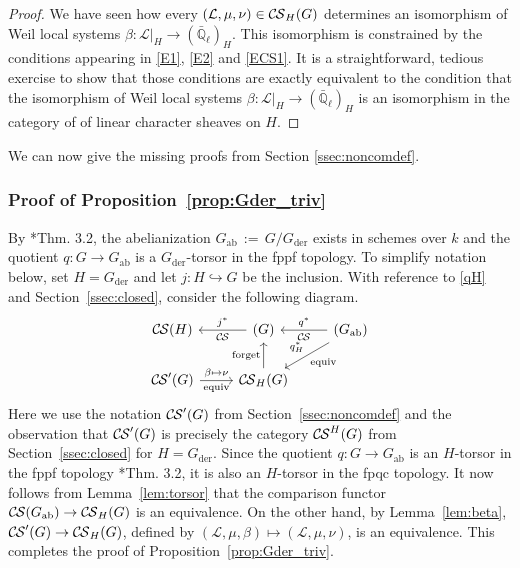 \documentclass[10pt]{amsart}
\theoremstyle{plain}
\theoremstyle{definition}
\newcommand{\EE}{\mathbb{\bar Q}_\ell}
\newcommand{\Fq}{k}
\newcommand{\der}{_{\operatorname{der}}}
\newcommand{\ab}{_{\operatorname{ab}}}
\newcommand{\ceq}{{\, :=\, }}
\newcommand{\cs}[1]{{\mathcal{#1}}}
\newcommand{\CS}{{\mathcal{C\hskip-0.8pt S}}}
\begin{document}
\begin{proof}
We have seen how every $(\cs{L},\mu,\nu)\in \CS_H(G)$ determines an isomorphism of Weil local systems $\beta : \cs{L}\vert_{H} \to (\EE)_{H}$.
This isomorphism is constrained by the conditions 
appearing in \eqref{E1}, \eqref{E2} and \eqref{ECS1}.
It is a straightforward, tedious exercise to show that those conditions are exactly equivalent to the condition
that the isomorphism of Weil local systems $\beta : \cs{L}\vert_{H} \to (\EE)_{H}$ is an isomorphism in the category of of linear character sheaves on $H$.
\end{proof}


We can now give the missing proofs from Section \ref{ssec:noncomdef}.

\subsubsection{Proof of Proposition~\ref{prop:Gder_triv}}\label{ssec:proof1}

By \cite{demazure:SGA3-VIA}*{Thm. 3.2}, the abelianization $G\ab\ceq G/G\der$ exists in schemes over $\Fq$ and the quotient $q: G \to G\ab$ is a $G\der$-torsor in the fppf topology.
%
To simplify notation below, set $H=G\der$
and let $j : H\hookrightarrow G$ be the inclusion. 
With reference to \eqref{qH} and Section~\ref{ssec:closed}, consider the following diagram.
\[
\begin{tikzcd}
\CS(H) & \arrow{l}[swap]{j^*} \CS(G) &\arrow{l}[swap]{q^*} 
\CS(G\ab) \arrow{dl}{\text{equiv}}[swap]{q_{H}^*} \\
 \CS'(G)  \arrow{r}{\beta \mapsto \nu}[swap]{\text{equiv}} &  \CS_{H}(G) \arrow{u}{\text{forget}}  & 
\end{tikzcd}
\]
%
Here we use the notation $\CS'(G)$ from Section~\ref{ssec:noncomdef} and the observation that $\CS'(G)$ is precisely the category $\CS^{H}(G)$ from Section~\ref{ssec:closed} for $H=G\der$.
%
Since the quotient $q : G \to G\ab$ is an $H$-torsor in the fppf topology \cite{demazure:SGA3-VIA}*{Thm. 3.2}, 
it is also an $H$-torsor in the fpqc topology.
It now follows from Lemma~\ref{lem:torsor} that the comparison functor $\CS(G\ab)\to \CS_{H}(G)$ is an equivalence.
%
On the other hand, by Lemma~\ref{lem:beta}, $\CS'(G) \to \CS_{H}(G)$, defined by $(\cs{L},\mu,\beta)\mapsto (\cs{L},\mu, \nu)$, is an equivalence.
This completes the proof of Proposition~\ref{prop:Gder_triv}.
\end{document}
